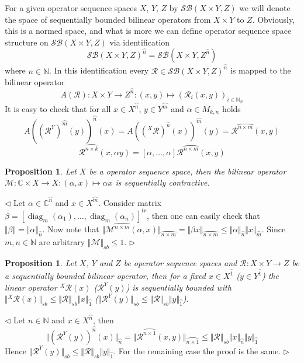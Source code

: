 \documentclass[12pt]{article}
\newtheorem{proposition}[theorem]{Proposition}
\newenvironment{proof}{\par $\triangleleft$}{$\triangleright$}
\begin{document}
For a given operator sequence spaces $X$, $Y$, $Z$ by $\mathcal{SB}(X\times Y, Z)$ we will denote the space of sequentially bounded bilinear operators from $X\times Y$ to $Z$. Obviously, this is a normed space, and what is more we can define operator sequence space structure on $\mathcal{SB}(X\times Y, Z)$ via identification
$$
\mathcal{SB}(X\times Y, Z)^{\wideparen{n}}=\mathcal{SB}(X\times Y,Z^{\wideparen{n}})
$$
where $n\in\mathbb{N}$. In this identification every $\mathcal{R}\in\mathcal{SB}(X\times Y,Z)^{\wideparen{n}}$ is mapped to the bilinear operator 
$$
A(\mathcal{R}):X\times Y\to Z^{\wideparen{n}}:(x,y)\mapsto(\mathcal{R}_i(x,y))_{i\in\mathbb{N}_n}
$$
It is easy to check that for all $x\in X^{\wideparen{n}}$, $y\in Y^{\wideparen{m}}$ and $\alpha\in M_{k,n}$  holds
$$
A((\mathcal{R}^Y)^{\wideparen{m}}(y))^{\wideparen{n}}(x)=A(({}^X\mathcal{R})^{\wideparen{n}}(x))^{\wideparen{m}}(y)=\mathcal{R}^{\wideparen{n\times m}}(x,y)
$$
$$
\mathcal{R}^{\wideparen{n\times k}}(x,\alpha y)
=[\alpha,\ldots,\alpha]\mathcal{R}^{\wideparen{n\times m}}(x,y)
$$


\begin{proposition}\label{PrScalMultSB}
Let $X$ be a operator sequence space, then the bilinear operator $\mathcal{M}:\mathbb{C}\times X\to X:(\alpha, x)\mapsto \alpha x$ is sequentially contractive.
\end{proposition}
\begin{proof}
Let $\alpha\in\mathbb{C}^{\wideparen{n}}$ and $x\in X^{\wideparen{m}}$. Consider matrix $\beta=[\operatorname{diag}_m(\alpha_1),\ldots,\operatorname{diag}_m(\alpha_n)]^{tr}$, then one can easily check that $\Vert\beta\Vert=\Vert\alpha\Vert_{\wideparen{n}}$. Now note that $\Vert\mathcal{M}^{\wideparen{n\times m}}(\alpha, x)\Vert_{\wideparen{n\times m}}
=\Vert\beta x\Vert_{\wideparen{n\times m}}
\leq\Vert\alpha\Vert_{\wideparen{n}}\Vert x\Vert_{\wideparen{m}}$. Since $m,n\in\mathbb{N}$ are arbitrary $\Vert\mathcal{M}\Vert_{sb}\leq 1$.
\end{proof}


\begin{proposition}\label{PrRestrOfSBBilOpIsSB}
Let $X$, $Y$ and $Z$ be operator sequence spaces and $\mathcal{R}:X\times Y\to Z$ be a sequentially bounded bilinear operator, then for a fixed $x\in X^{\wideparen{1}}$ ($y\in Y^{\wideparen{1}}$) the linear operator ${}^X\mathcal{R}(x)$ ($\mathcal{R}^Y(y)$) is sequentially bounded with $\Vert{}^X\mathcal{R}(x)\Vert_{sb}\leq\Vert\mathcal{R}\Vert_{sb}\Vert x\Vert_{\wideparen{1}}$ ($\Vert\mathcal{R}^Y(y)\Vert_{sb}\leq\Vert\mathcal{R}\Vert_{sb}\Vert y\Vert_{\wideparen{1}}$).
\end{proposition}
\begin{proof}
Let $n\in\mathbb{N}$ and $x\in X^{\wideparen{n}}$, then
$$
\Vert(\mathcal{R}^Y(y))^{\wideparen{n}}(x)\Vert_{\wideparen{n}}
=\Vert \mathcal{R}^{\wideparen{n\times 1}}(x,y)\Vert_{\wideparen{n\times 1}}
\leq\Vert \mathcal{R}\Vert_{sb}\Vert x\Vert_{\wideparen{n}}\Vert y\Vert_{\wideparen{1}}
$$
Hence $\Vert\mathcal{R}^Y(y)\Vert_{sb}\leq\Vert\mathcal{R}\Vert_{sb}\Vert y\Vert_{\wideparen{1}}$.
For the remaining case the proof is the same.
\end{proof}
\end{document}
